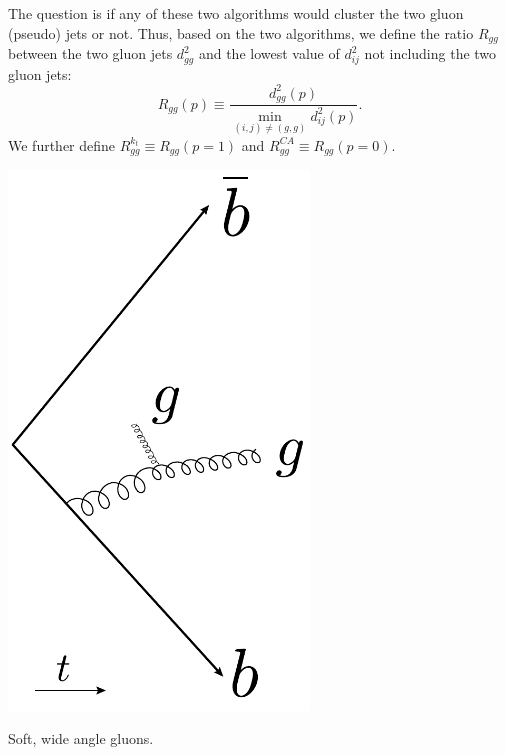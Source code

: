 The question is if any of these two algorithms would cluster the two gluon (pseudo) jets or not. Thus, based on the two algorithms, we define the ratio $R_{gg}$ between the two gluon jets $d^2_{gg}$ and the lowest value of $d^2_{ij}$ not including the two gluon jets:
\begin{equation}
  R_{gg}(p) \equiv \frac{d^2_{gg}(p)}{\min_{(i,j) \neq (g,g)} d^2_{ij}(p)}.
\end{equation} 
We further define $R_{gg}^{k_t} \equiv R_{gg}(p=1)$ and $R_{gg}^{CA} \equiv R_{gg}(p=0)$. 

\begin{marginfigure}[-8cm]
  \centerfloat
  \includegraphics[width=0.6\textwidth]{figures/R_kt_CA/soft_wide_angle.pdf}
  \caption[Soft Wide Angle Gluons in 4-Jet Events]
          {Soft, wide angle gluons.} 
  \label{fig:q:kt_CA_soft_wide}
\end{marginfigure}


